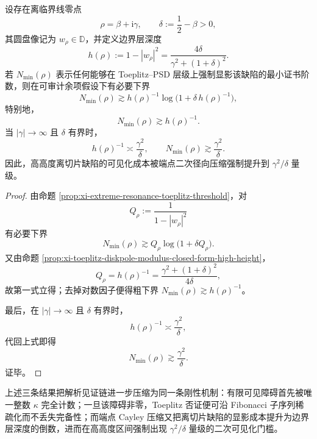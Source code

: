 \begin{corollary}\label{cor:conclusion-toeplitz-endpoint-quadratic-height-law}
设存在离临界线零点
\[
\rho=\beta+\mathrm{i}\gamma,
\qquad
\delta:=\frac12-\beta>0,
\]
其圆盘像记为 \(w_\rho\in\mathbb D\)，并定义边界层深度
\[
h(\rho):=1-|w_\rho|^2=\frac{4\delta}{\gamma^2+(1+\delta)^2}.
\]
若 \(N_{\min}(\rho)\) 表示任何能够在 Toeplitz--PSD 层级上强制显影该缺陷的最小证书阶数，则在可审计余项假设下有必要下界
\[
N_{\min}(\rho)\gtrsim h(\rho)^{-1}\log\!\bigl(1+\delta\,h(\rho)^{-1}\bigr),
\]
特别地，
\[
N_{\min}(\rho)\gtrsim h(\rho)^{-1}.
\]
当 \(|\gamma|\to\infty\) 且 \(\delta\) 有界时，
\[
h(\rho)^{-1}\asymp \frac{\gamma^2}{\delta},
\qquad
N_{\min}(\rho)\gtrsim \frac{\gamma^2}{\delta}.
\]
因此，高高度离切片缺陷的可见化成本被端点二次径向压缩强制提升到 \(\gamma^2/\delta\) 量级。
\end{corollary}
\begin{proof}
由命题 \ref{prop:xi-extreme-resonance-toeplitz-threshold}，对
\[
Q_\rho:=\frac{1}{1-|w_\rho|^2}
\]
有必要下界
\[
N_{\min}(\rho)\gtrsim Q_\rho\log\!\bigl(1+\delta Q_\rho\bigr).
\]
又由命题 \ref{prop:xi-toeplitz-diskpole-modulus-closed-form-high-height}，
\[
Q_\rho=h(\rho)^{-1}
=\frac{\gamma^2+(1+\delta)^2}{4\delta},
\]
故第一式立得；去掉对数因子便得粗下界 \(N_{\min}(\rho)\gtrsim h(\rho)^{-1}\)。

最后，在 \(|\gamma|\to\infty\) 且 \(\delta\) 有界时，
\[
h(\rho)^{-1}
\asymp
\frac{\gamma^2}{\delta},
\]
代回上式即得
\[
N_{\min}(\rho)\gtrsim \frac{\gamma^2}{\delta}.
\]
证毕。
\end{proof}

上述三条结果把解析见证链进一步压缩为同一条刚性机制：有限可见障碍首先被唯一整数 \(\kappa\) 完全计数；一旦该障碍非零，Toeplitz 否证便可沿 Fibonacci 子序列稀疏化而不丢失完备性；而端点 Cayley 压缩又把离切片缺陷的显影成本提升为边界层深度的倒数，进而在高高度区间强制出现 \(\gamma^2/\delta\) 量级的二次可见化门槛。
